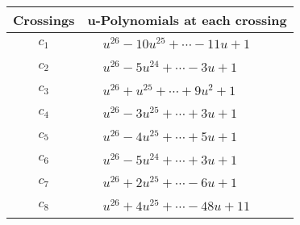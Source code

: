 \documentclass[1p]{elsarticle_modified}
\theoremstyle{definition}
\begin{document}
\begin{tabular}{m{50pt}|m{274pt}}
Crossings & \hspace{64pt}u-Polynomials at each crossing \\
\hline $$\begin{aligned}c_{1}\end{aligned}$$&$\begin{aligned}
&u^{26}-10 u^{25}+\cdots-11 u+1
\end{aligned}$\\
\hline $$\begin{aligned}c_{2}\end{aligned}$$&$\begin{aligned}
&u^{26}-5 u^{24}+\cdots-3 u+1
\end{aligned}$\\
\hline $$\begin{aligned}c_{3}\end{aligned}$$&$\begin{aligned}
&u^{26}+u^{25}+\cdots+9 u^2+1
\end{aligned}$\\
\hline $$\begin{aligned}c_{4}\end{aligned}$$&$\begin{aligned}
&u^{26}-3 u^{25}+\cdots+3 u+1
\end{aligned}$\\
\hline $$\begin{aligned}c_{5}\end{aligned}$$&$\begin{aligned}
&u^{26}-4 u^{25}+\cdots+5 u+1
\end{aligned}$\\
\hline $$\begin{aligned}c_{6}\end{aligned}$$&$\begin{aligned}
&u^{26}-5 u^{24}+\cdots+3 u+1
\end{aligned}$\\
\hline $$\begin{aligned}c_{7}\end{aligned}$$&$\begin{aligned}
&u^{26}+2 u^{25}+\cdots-6 u+1
\end{aligned}$\\
\hline $$\begin{aligned}c_{8}\end{aligned}$$&$\begin{aligned}
&u^{26}+4 u^{25}+\cdots-48 u+11
\end{aligned}$\\

\end{tabular}
\end{document}
